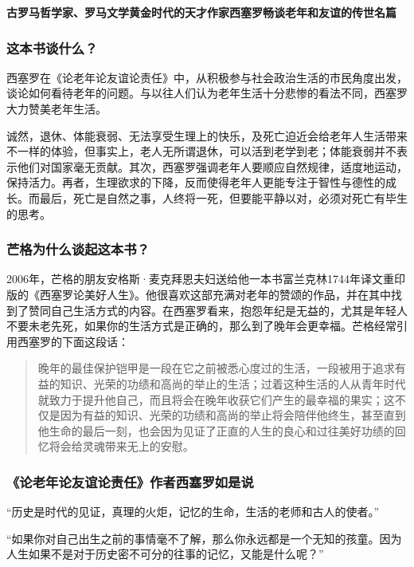 \cleardoublepage
{}


\begin{BookSummaryBox}
\textbf{古罗马哲学家、罗马文学黄金时代的天才作家西塞罗畅谈老年和友谊的传世名篇}
\par
\end{BookSummaryBox}

\subsubsection*{这本书谈什么？}

西塞罗在《论老年论友谊论责任》中，从积极参与社会政治生活的市民角度出发，谈论如何看待老年的问题。与以往人们认为老年生活十分悲惨的看法不同，西塞罗大力赞美老年生活。
\par

诚然，退休、体能衰弱、无法享受生理上的快乐，及死亡迫近会给老年人生活带来不一样的体验，但事实上，老人无所谓退休，可以活到老学到老；体能衰弱并不表示他们对国家毫无贡献。其次，西塞罗强调老年人要顺应自然规律，适度地运动，保持活力。再者，生理欲求的下降，反而使得老年人更能专注于智性与德性的成长。而最后，死亡是自然之事，人终将一死，但要能平静以对，必须对死亡有毕生的思考。
\par

\subsubsection*{芒格为什么谈起这本书？}

2006年，芒格的朋友安格斯·麦克拜恩夫妇送给他一本书富兰克林1744年译文重印版的《西塞罗论美好人生》。他很喜欢这部充满对老年的赞颂的作品，并在其中找到了赞同自己生活方式的内容。在西塞罗看来，抱怨年纪是无益的，尤其是年轻人不要未老先死，如果你的生活方式是正确的，那么到了晚年会更幸福。芒格经常引用西塞罗的下面这段话：
\par

\begin{quotation}
晚年的最佳保护铠甲是一段在它之前被悉心度过的生活，一段被用于追求有益的知识、光荣的功绩和高尚的举止的生活；过着这种生活的人从青年时代就致力于提升他自己，而且将会在晚年收获它们产生的最幸福的果实；这不仅是因为有益的知识、光荣的功绩和高尚的举止将会陪伴他终生，甚至直到他生命的最后一刻，也会因为见证了正直的人生的良心和过往美好功绩的回忆将会给灵魂带来无上的安慰。
\par
\end{quotation}

\subsubsection*{《论老年论友谊论责任》作者西塞罗如是说}

“历史是时代的见证，真理的火炬，记忆的生命，生活的老师和古人的使者。”
\par

“如果你对自己出生之前的事情毫不了解，那么你永远都是一个无知的孩童。因为人生如果不是对于历史密不可分的往事的记忆，又能是什么呢？”
\par
